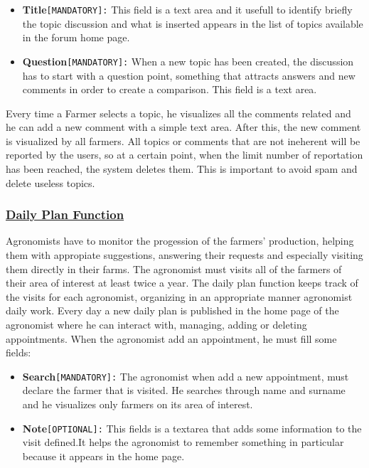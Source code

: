 		\begin{itemize}
	 		\item \textbf{Title}\texttt{[MANDATORY]:} This field is a text area and it usefull to identify briefly the topic discussion and what is inserted appears in the list of topics available in the forum home page.
	 		
	 		\item \textbf{Question}\texttt{[MANDATORY]:} When a new topic has been created, the discussion has to start with a question point, something that attracts answers and new comments in order to create a comparison. This field is a text area.
		\end{itemize}
	
	Every time a Farmer selects a topic, he visualizes all the comments related and he can add a new comment with a simple text area. After this, the new comment is visualized by all farmers. All topics or comments that are not ineherent will be reported by the users, so at a certain point, when the limit number of reportation has been reached, the system deletes them.
	This is important to avoid spam and delete useless topics.
	
	\subsubsection[Daily Plan Function]{\hyperlink{toc}{Daily Plan Function}}
		\label{sec:dailyplanFunction}
	Agronomists have to monitor the progession of the farmers' production, helping them with appropiate suggestions, answering their requests and especially visiting them directly in their farms. The agronomist must visits all of the farmers of their area of interest at least twice a year. The daily plan function keeps track of the visits for each agronomist, organizing in an appropriate manner agronomist daily work. Every day a new daily plan is published in the home page of the agronomist where he can interact with, managing, adding or deleting appointments. When the agronomist add an appointment, he must fill some fields:
		
		\begin{itemize}
			\item \textbf{Search}\texttt{[MANDATORY]:} The agronomist when add a new appointment, must declare the farmer that is visited. He searches through name and surname and he visualizes only farmers on its area of interest.
			
			\item \textbf{Note}\texttt{[OPTIONAL]:} This fields is a textarea that adds some information to the visit defined.It helps the agronomist to remember something in particular because it appears in the home page.
		\end{itemize}
		
